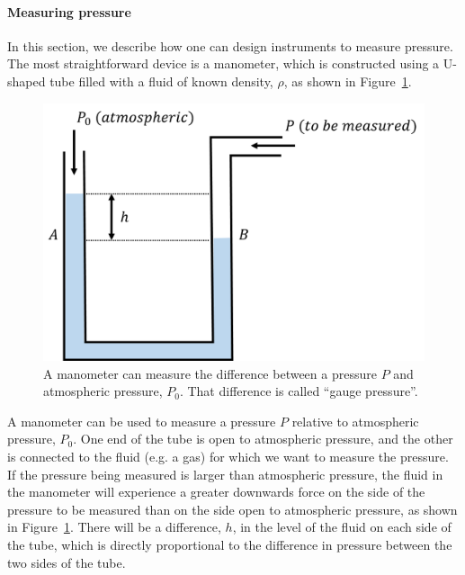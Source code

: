 \paragraph{Measuring pressure}

In this section, we describe how one can design instruments to measure pressure. The most straightforward device is a manometer, which is constructed using a U-shaped tube filled with a fluid of known density, $\rho$, as shown in Figure~\ref{fig:fluidmechanics:manometer}.

\begin{figure}[!htbp]
\centering
\includegraphics[width=0.65\linewidth]{files/manometer-2dfb021d7a68dc0d4b34f2cb901c2913.png}
\caption[]{A manometer can measure the difference between a pressure $P$ and atmospheric pressure, $P_0$. That difference is called ``gauge pressure''.}
\label{fig:fluidmechanics:manometer}
\end{figure}

A manometer can be used to measure a pressure $P$ relative to atmospheric pressure, $P_0$. One end of the tube is open to atmospheric pressure, and the other is connected to the fluid (e.g. a gas) for which we want to measure the pressure. If the pressure being measured is larger than atmospheric pressure, the fluid in the manometer will experience a greater downwards force on the side of the pressure to be measured than on the side open to atmospheric pressure, as shown in Figure~\ref{fig:fluidmechanics:manometer}. There will be a difference, $h$, in the level of the fluid on each side of the tube, which is directly proportional to the difference in pressure between the two sides of the tube.

